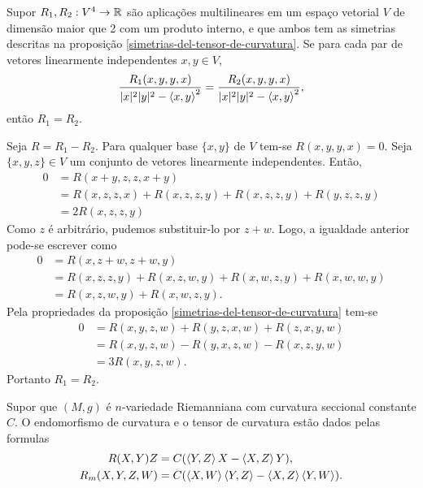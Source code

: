 \begin{lema}\label{igualdade-de-4-tensores-covariantes}
	Supor $R_1,R_2: V^4 \rightarrow \mathbb R$ são aplicações multilineares em um espaço vetorial $V$ de dimensão maior que 2 com um produto interno, e que ambos tem as simetrias descritas na proposição \ref{simetrias-del-tensor-de-curvatura}. Se para cada par de vetores linearmente independentes $x,y \in V$,
	\begin{equation*}
		\frac{R_1(x,y,y,x)}{|x|^2 |y|^2 - \left\langle x,y \right\rangle^2} = \frac{R_2(x,y,y,x)}{|x|^2 |y|^2 - \left\langle x,y \right\rangle^2},
	\end{equation*}
	então $R_1 = R_2$.
\end{lema}

\begin{demonstracao}
	Seja $R = R_1 - R_2$.
	Para qualquer base $\{x,y\}$ de $V$ tem-se $R(x,y,y,x)=0$.
	Seja $\{x,y,z\} \in V$ um conjunto de vetores linearmente independentes. Então,
	\begin{align*}
		0 &= R(x+y,z,z,x+y)\\
		&= R(x,z,z,x) + R(x,z,z,y) + R(x,z,z,y) + R(y,z,z,y)\\
		&= 2R(x,z,z,y)
	\end{align*}
	Como $z$ é arbitrário, pudemos substituir-lo por $z+w$. Logo, a igualdade anterior pode-se escrever como
	\begin{align*}
		0 &= R(x,z+w,z+w,y)\\
		&= R(x,z,z,y) + R(x,z,w,y) + R(x,w,z,y) + R(x,w,w,y)\\
		&= R(x,z,w,y) + R(x,w,z,y).
	\end{align*}
	Pela propriedades da proposição \ref{simetrias-del-tensor-de-curvatura} tem-se
	\begin{align*}
		0 &= R(x,y,z,w) + R(y,z,x,w) + R(z,x,y,w)\\
		&= R(x,y,z,w) - R(y,x,z,w) - R(x,z,y,w)\\
		&= 3R(x,y,z,w).
	\end{align*}
	Portanto $R_1 = R_2$.
\end{demonstracao}

\begin{lema}
	Supor que $(M,g)$ é $n$-variedade Riemanniana com curvatura seccional constante $C$. O endomorfismo de curvatura e o tensor de curvatura estão dados pelas formulas
	\begin{align*}
		R(X,Y)Z &= C(\left\langle Y,Z \right\rangle X - \left\langle X,Z \right\rangle Y),\\
		R_m(X,Y,Z,W) &= C(\left\langle X,W \right\rangle \left\langle Y,Z \right\rangle - \left\langle X,Z \right\rangle \left\langle Y,W \right\rangle).
	\end{align*}
\end{lema}

